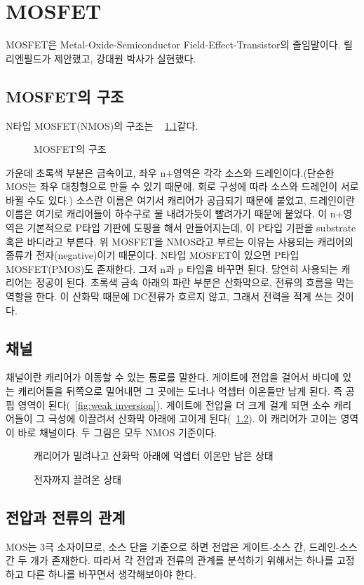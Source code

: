 \chapter{MOSFET}
MOSFET은 Metal-Oxide-Semiconductor Field-Effect-Transistor의 줄임말이다. 릴리엔필드가 제안했고, 강대원 박사가 실현했다.
\section{MOSFET의 구조}
N타입 MOSFET(NMOS)의 구조는 \figurename~ \ref{fig:mos structure}\와 같다.
\begin{figure}
    \centering
    \caption{MOSFET의 구조}\label{fig:mos structure}
\end{figure}
가운데 초록색 부분은 금속이고, 좌우 n+영역은 각각 소스와 드레인이다.(단순한 MOS는 좌우 대칭형으로 만들 수 있기 때문에, 회로 구성에 따라 소스와 드레인이 서로 바뀔 수도 있다.)
소스란 이름은 여기서 캐리어가 공급되기 때문에 붙었고, 드레인이란 이름은 여기로 캐리어들이 하수구로 물 내려가듯이 빨려가기 때문에 붙었다.
이 n+영역은 기본적으로 P타입 기판에 도핑을 해서 만들어지는데, 이 P타입 기판을 substrate 혹은 바디라고 부른다.
위 MOSFET을 NMOS라고 부르는 이유는 사용되는 캐리어의 종류가 전자(negative)이기 때문이다.
N타입 MOSFET이 있으면 P타입 MOSFET(PMOS)도 존재한다. 그저 n과 p 타입을 바꾸면 된다. 당연히 사용되는 캐리어는 정공이 된다.
초록색 금속 아래의 파란 부분은 산화막으로, 전류의 흐름을 막는 역할을 한다. 이 산화막 때문에 DC전류가 흐르지 않고, 그래서 전력을 적게 쓰는 것이다.

\section{채널}
채널이란 캐리어가 이동할 수 있는 통로를 말한다. 게이트에 전압을 걸어서 바디에 있는 캐리어들을 뒤쪽으로 밀어내면 그 곳에는 도너나 억셉터 이온들만 남게 된다. 즉 공핍 영역이 된다(\figurename~\ref{fig:weak inversion}).
게이트에 전압을 더 크게 걸게 되면 소수 캐리어들이 그 극성에 이끌려서 산화막 아래에 고이게 된다(\figurename~\ref{fig:strong inversion}). 이 캐리어가 고이는 영역이 바로 채널이다. 두 그림은 모두 NMOS 기준이다.
\begin{figure}
    \centering
    \caption{캐리어가 밀려나고 산화막 아래에 억셉터 이온만 남은 상태}\label{fig:weak inversion}
    \caption{전자까지 끌려온 상태}\label{fig:strong inversion}
\end{figure}

\section{전압과 전류의 관계}
MOS는 3극 소자이므로, 소스 단을 기준으로 하면 전압은 게이트-소스 간, 드레인-소스 간 두 개가 존재한다. 따라서 각 전압과 전류의 관계를 분석하기 위해서는 하나를 고정하고 다른 하나를 바꾸면서 생각해보아야 한다.
